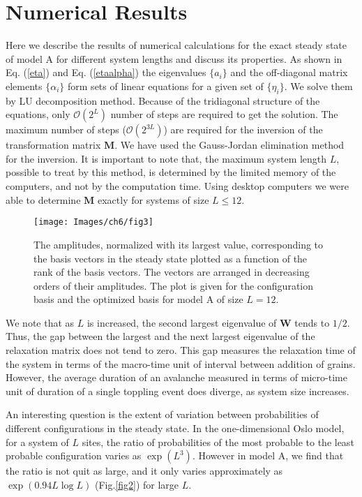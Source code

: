 \documentclass[11pt,a4paper]{book}
\begin{document}
\section{Numerical Results}\label{sec:ch5.7}
Here we describe the results of numerical calculations for the exact steady state of model A for
different system lengths and discuss its properties.
As shown in Eq. (\ref{eta}) and Eq. (\ref{etaalpha}) the
eigenvalues $\{a_i\}$ and the off-diagonal matrix elements
$\{\alpha_i\}$ form sets of linear equations
for a given set of $\{\eta_i\}$. We solve them by LU
decomposition method. Because of the tridiagonal structure
of the equations, only $\mathcal{O}(2^L)$ number of steps are required
to get the solution. The maximum number of steps ($\mathcal{O}(2^{3L})$)
are required for the inversion of the transformation matrix
$\mathbf{M}$. We have used the Gauss-Jordan elimination method
for the inversion. It is important to note that, the
maximum system length $L$, possible to treat by this method,
is determined by the limited memory of the computers,
and not by the computation time. Using desktop computers we were able
to determine $\mathbf{M}$ exactly for systems of size $L\le12$. 
\begin{figure}
 \begin{center}
    \texttt{[image: Images/ch6/fig3]}
    \caption{The amplitudes, normalized with its largest value, corresponding to the basis vectors
 in the steady state plotted
as a function of the rank of the basis vectors.
The vectors are arranged in decreasing orders of their
amplitudes. The plot is given for the configuration basis and the
optimized basis for model A of size $L=12$.}
    \label{fig3}
  \end{center}
\end{figure}

We note that as $L$ is increased, the second largest eigenvalue of
$\mathbf{W}$
tends to $1/2$. Thus, the gap between the largest and the next largest
eigenvalue of the relaxation matrix does not tend to zero. 
This gap measures the relaxation time of the system in terms of the
macro-time unit of interval between addition of grains. However, the
average duration of an avalanche measured in terms of micro-time unit
of duration of a single toppling event does diverge, as system size
increases.

An interesting question is the extent of  variation between 
probabilities of
different configurations in the steady state. In the one-dimensional
Oslo model, for a system of $L$ sites, the ratio of probabilities of
the most probable to the least probable configuration varies as
$\exp(L^3)$\cite{dharoslo}.
However in model A, we find that the ratio is not quit as large, and it
only varies approximately as $\exp(0.94L\log L)$ (Fig.\ref{fig2}) for 
large $L$. 
\end{document}
